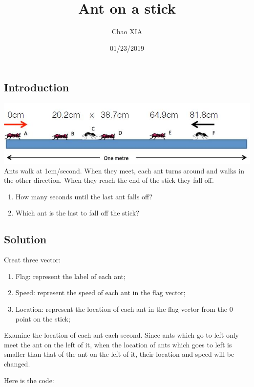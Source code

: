 \documentclass[]{article}
\title{Ant on a stick}
\author{Chao XIA}
\date{01/23/2019}
\begin{document}
\maketitle

\subsection{Introduction}\label{introduction}

\includegraphics{ant.jpg}\\
Ants walk at 1cm/second. When they meet, each ant turns around and walks
in the other direction. When they reach the end of the stick they fall
off.

\begin{enumerate}
\def\labelenumi{(\arabic{enumi})}
\item
  How many seconds until the last ant falls off?
\item
  Which ant is the last to fall off the stick?
\end{enumerate}

\subsection{Solution}\label{solution}

Creat three vector:

\begin{enumerate}
\def\labelenumi{(\arabic{enumi})}
\item
  Flag: represent the label of each ant;
\item
  Speed: represent the speed of each ant in the flag vector;
\item
  Location: represent the location of each ant in the flag vector from
  the 0 point on the stick;
\end{enumerate}

Examine the location of each ant each second. Since ants which go to
left only meet the ant on the left of it, when the location of ants
which goes to left is smaller than that of the ant on the left of it,
their location and speed will be changed.

Here is the code:
\end{document}
